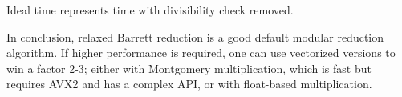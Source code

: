 \noindent
Ideal time represents time with divisibility check removed.

In conclusion, relaxed Barrett reduction is a good default modular reduction algorithm.
If higher performance is required, one can use vectorized versions to win a factor 2-3; either with
Montgomery multiplication, which is fast but requires AVX2 and has a complex API, or with
float-based multiplication.
